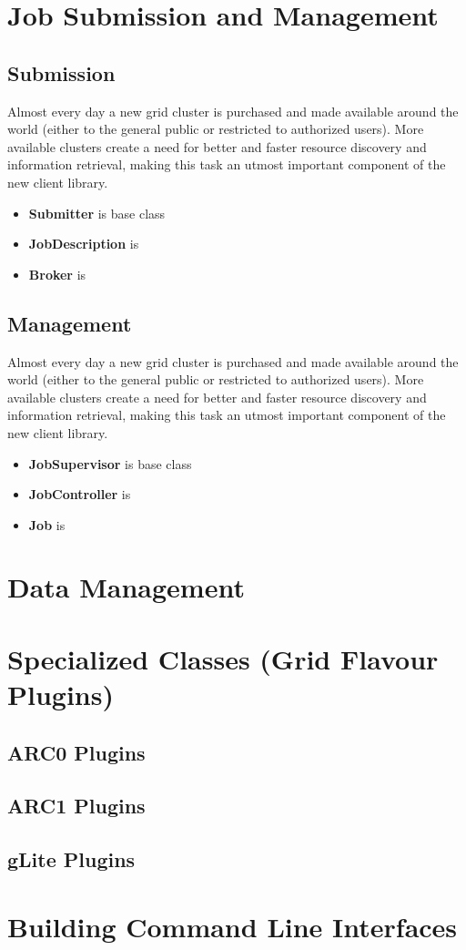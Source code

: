 \documentclass{book}
\begin{document}
\chapter{Job Submission and Management}
\label{sec:JobManagement}
\section{Submission}
Almost every day a new grid cluster is purchased and made available around the world (either to the 
general public or restricted to authorized users). More available clusters create a need for better and 
faster resource discovery and information retrieval, making this task an utmost important component of the 
new client library.

\begin{itemize}
\item{{\bf Submitter} is base class}

\item{{\bf JobDescription} is }

\item{{\bf Broker} is }
\end{itemize}

\section{Management}
Almost every day a new grid cluster is purchased and made available around the world (either to the 
general public or restricted to authorized users). More available clusters create a need for better and 
faster resource discovery and information retrieval, making this task an utmost important component of the 
new client library.

\begin{itemize}
\item{{\bf JobSupervisor} is base class}

\item{{\bf JobController} is }

\item{{\bf Job} is }
\end{itemize}

\chapter{Data Management}
\label{sec:DataManagement}

\chapter{Specialized Classes (Grid Flavour Plugins)}
\label{sec:plugins}
\section{ARC0 Plugins}
\section{ARC1 Plugins}
\section{gLite Plugins}

\chapter{Building Command Line Interfaces}
\label{sec:cli}


\end{document}
